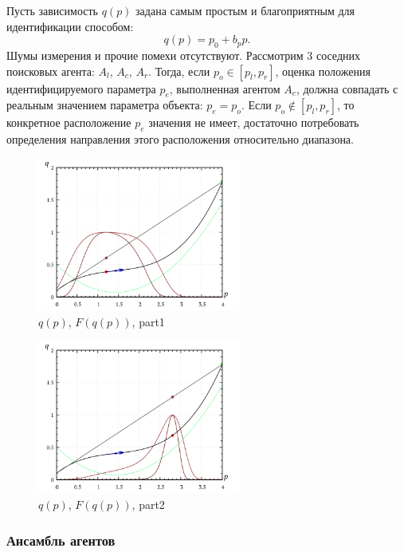 Пусть зависимость $q(p)$ задана самым простым и благоприятным для идентификации способом:
%
\[
  q(p) = p_0 + b_p p .
\]
Шумы измерения и прочие помехи отсутствуют.
Рассмотрим 3 соседних поисковых агента: $A_l$, $A_c$, $A_r$.
Тогда, если $p_o \in [ p_l, p_r ] $, оценка положения
идентифицируемого параметра $p_e$, выполненная агентом $A_c$,
должна совпадать с реальным значением параметра объекта: $p_e = p_o $.
Если $p_o \notin [ p_l, p_r ] $, то конкретное расположение
$p_e$ значения не имеет, достаточно потребовать определения направления
этого расположения относительно диапазона. %


\begin{figure}[htb!]
  \centerline{\includegraphics[width=0.6\textwidth]{pq_1x2.png} }
  \caption{ $q(p)$, $F(q(p))$, part1 }
  \label{atu:pq_1x2}
\end{figure}

\begin{figure}[htb!]
  \centerline{\includegraphics[width=0.6\textwidth]{pq_2x8.png} }
  \caption{$q(p)$, $F(q(p))$, part2 }
  \label{atu:pq_2x8}
\end{figure}

\subsubsection{Ансамбль агентов}

